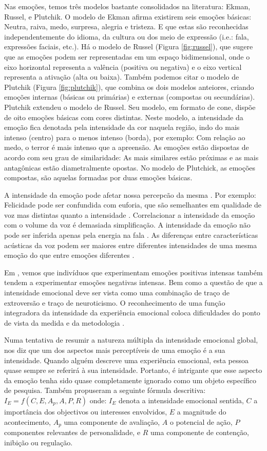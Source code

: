 Nas emoções, temos três modelos bastante consolidados na literatura: Ekman, Russel, e Plutchik. O modelo de Ekman \cite{31.9} afirma existirem seis emoções básicas: Neutra, raiva, medo, surpresa, alegria e tristeza. E que estas são reconhecidas independentemente do idioma, da cultura ou dos meio de expressão (i.e.: fala, expressões faciais, etc.). Há o modelo de Russel \cite{31.10} (Figura \ref{fig:russel}), que sugere que as emoções podem ser representadas em um espaço bidimensional, onde o eixo horizontal representa a valência (positiva ou negativa) e o eixo vertical representa a ativação (alta ou baixa). Também podemos citar o modelo de Plutchik \cite{57} (Figura \ref{fig:plutchik}), que combina os dois modelos anteiores, criando emoções internas (básicas ou primárias) e externas (compostas ou secundárias). Plutchik extendeu \cite{57} o modelo de Russel. Seu modelo, em formato de cone, dispõe de oito emoções básicas com cores distintas. Neste modelo, a intensidade da emoção fica denotada pela intensidade da cor naquela região, indo do mais intenso (centro) para o menos intenso (borda), por exemplo: Com relação ao medo, o terror é mais intenso que a apreensão. As emoções estão dispostas de acordo com seu grau de similaridade: As mais similares estão próximas e as mais antagônicas estão diametralmente opostas. No modelo de Plutchick, as emoções compostas, são aquelas formadas por duas emoções básicas.

A intensidade da emoção pode afetar nossa percepcão da mesma \cite{18.46}. Por exemplo: Felicidade pode ser confundida com euforia, que são semelhantes em qualidade de voz mas distintas quanto a intensidade \cite{18.9}. Correlacionar a intensidade da emoção com o volume da voz é demasiada simplificação. A intensidade da emoção não pode ser inferida apenas pela energia na fala \cite{18.12}. As diferenças entre características acústicas da voz podem ser maiores entre diferentes intensidades de uma mesma emoção do que entre emoções diferentes \cite{18.46}. 

Em \cite{emoint1}, vemos que indivíduos que experimentam emoções positivas intensas também tendem a experimentar emoções negativas intensas. Bem como a questão de que a intensidade emocional deve ser vista como uma combinação de traço de extroversão e traço de neuroticismo. O reconhecimento de uma função integradora da intensidade da experiência emocional coloca dificuldades do ponto de vista da medida e da metodologia \cite{emoint2}.

Numa tentativa de resumir a natureza múltipla da intensidade emocional global, \cite{emoint2.1} nos diz que um dos aspectos mais perceptíveis de uma emoção é a sua intensidade. Quando alguém descreve uma experiência emocional, esta pessoa quase sempre se referirá à sua intensidade. Portanto, é intrigante que esse aspecto da emoção tenha sido quase completamente ignorado como um objeto específico de pesquisa. Também propuseram a seguinte fórmula descritiva: $I_E = f(C, E, A_p, A, P, R)$ onde: $I_E$ denota a intensidade emocional sentida, $C$ a importância dos objectivos ou interesses envolvidos, $E$ a magnitude do acontecimento, $A_p$ uma componente de avaliação, $A$ o potencial de ação, $P$ componentes relevantes de personalidade, e $R$ uma componente de contenção, inibição ou regulação.

